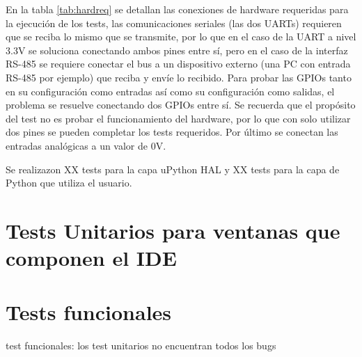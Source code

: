 En la tabla \ref{tab:hardreq} se detallan las conexiones de hardware requeridas para la ejecución de los tests, las comunicaciones seriales (las dos UARTs) requieren que se reciba lo mismo que se transmite, por lo que en el caso de la UART a nivel 3.3V se soluciona conectando ambos pines entre sí, pero en el caso de la interfaz RS-485 se requiere conectar el bus a un dispositivo externo (una PC con entrada RS-485 por ejemplo) que reciba y envíe lo recibido.
Para probar las GPIOs tanto en su configuración como entradas así como su configuración como salidas, el problema se resuelve conectando dos GPIOs entre sí. Se recuerda que el propósito del test no es probar el funcionamiento del hardware, por lo que con solo utilizar dos pines se pueden completar los tests requeridos. Por último se conectan las entradas analógicas a un valor de 0V.

Se realizazon XX tests para la capa uPython HAL y XX tests para la capa de Python que utiliza el usuario.

\section{Tests Unitarios para ventanas que componen el IDE}
\label{sec:testUnitariosIDE}




\section{Tests funcionales}
\label{sec:testUnitariosIDE}


test funcionales:
los test unitarios no encuentran todos los bugs


